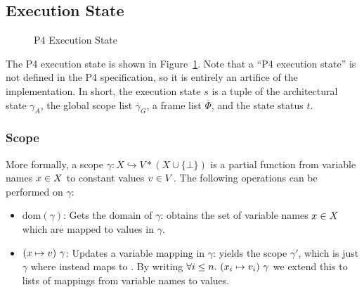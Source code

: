 \documentclass[UTF8]{article}
\begin{document}
\newpage
\newcommand{\exstate}{\ensuremath{s}}
\newcommand{\astate}{\ensuremath{{\gamma}_A}}
\newcommand{\currsf}{\ensuremath{\varepsilon}}
\newcommand{\gscope}{\ensuremath{{\gamma}_G}}
\newcommand{\gscopel}{\ensuremath{\overline{\gamma_G}}}
\newcommand{\escope}{\ensuremath{{\gamma}_{\emptyset}}}
\newcommand{\cstack}{E}
\newcommand{\status}{\ensuremath{t}}
\newcommand{\running}{\textbf{run}}
\newcommand{\returnst}[1]{\ensuremath{\textbf{ret}\;#1}}
\newcommand{\trans}[1]{\ensuremath{\textbf{tra}\;#1}}
\newcommand{\sterr}{\ensuremath{\bot}}
\newcommand{\pfin}{\ensuremath{p_{\mathrm{fin}}}}
\newcommand{\expr}{\ensuremath{e}}
\newcommand{\varstar}{\mathbf{var} ( \mathbf{star} , funn )}
\newcommand{\scope}{\gamma}
\newcommand{\scopeL}{\overline{\gamma}}
\newcommand{\stmtL}{\overline{stmt}}
\newcommand{\cons}{, ... \, ,}
\newcommand{\concat}{{+}\mspace{-8mu}{+}}
\newcommand{\bitv}{\ensuremath{bitv}}
\newcommand{\estmt}{\emptyset_{ \mathrm{stmt} }}
\newcommand{\frameL}{\overline{\Phi}}
\newcommand{\declL}{\overline{decl}}
\newcommand{\fapp}{\ensuremath{\mathit{table\_apply}}}

\subsection{Execution State}

\begin{figure}[h!]
\centering\ottgrammartabular{
\ottstatus\ottinterrule
\ottstate\ottafterlastrule
}
\caption{P4 Execution State}  %
\label{fig:status}
\end{figure}

The P4 execution state is shown in Figure~\ref{fig:status}. Note that a ``P4 execution state'' is not defined in the P4 specification, so it is entirely an artifice of the \pfott{} implementation. In short, the execution state \exstate{} is a tuple of the architectural state \astate{}, the global scope list $\scopeL_G$, a frame list $\frameL$, and the state status \status{}. 

\subsubsection*{Scope}
More formally, a scope $\gamma : X \hookrightarrow V * (X \cup \{ \bot \} )$ is a partial function from variable names $x{} \in X$ to constant values $v{} \in V$. The following operations can be performed on $\scope$:
\begin{itemize}
\item $\mathrm{dom} ( \gamma )$: Gets the domain of $\gamma$: obtains the set of variable names $x{} \in X$ which are mapped to values in $\gamma$.
\item $(x \mapsto  v) \,\, \gamma$: Updates a variable mapping in $\gamma$: yields the scope $\gamma'$, which is just $\gamma$ where \vn{} instead maps to \cval{}. By writing $\forall i \leq n. \,\, ({x}_i \mapsto  {\ensuremath{v}}_i) \,\, \gamma$ we extend this to lists of mappings from variable names to values.
\end{itemize}
\end{document}
